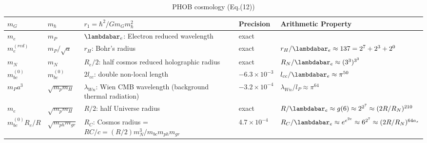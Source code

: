 \documentclass[a4paper,9pt]{article}
\newcounter{col}
\begin{document}
 

 
\begin{table}
\caption[Table \ref{tab:5:table5}: PHOB Cosmology.]{PHOB cosmology (Eq.(12))}
\label{tab:5:table5}
  \hskip-2.0cm\begin{tabular}{lllll}
    \toprule
    \cmidrule(r){1-4}
    $m_G$ & $m_{\hbar}$    & $r_1 = \hbar^2/Gm_G m_{\hbar}^2$  & Precision &Arithmetic Property \\
    \midrule
    
    $m_e$ & $m_P $ & $\lambdabar_e$: Electron reduced wavelength   & exact & \\
    
    $m_e^{(red)}$ & $m_P/\sqrt a $ & $r_H$: Bohr's radius   & exact & $ r_H/\lambdabar_e \approx 137 = 2^7+2^3+2^0 $\\
    
    $m_N $ & $m_N$   & $R_e/2$: half cosmos reduced holographic radius  &  exact & $R_N/\lambdabar_e \approx (3^3)^{3^3}$ \\
    $m_{bc}^{(0)} $ & $m_{bc}^{(0)}$   & $2l_{cc}$: double non-local length & $-6.3 \times 10^{-3}$ & $ l_{cc}/\lambdabar_e \approx \pi^{50}$  \\
    $m_Pa^3 $ & $\sqrt {m_pm_H}$  &$\lambda_{Wn}$: Wien CMB wavelength (background thermal radiation) & $-3.2 \times 10^{-4}$ &$\lambda_{Wn}/l_P \approx \pi^{64}$\\
    $m_e $ & $\sqrt {m_pm_H}$   & $R/2$: half Universe radius &exact& $R/\lambdabar_e \approx g(6) \approx 2^{2^7}\approx (2R/R_N)^{210}$   \\
    
    $m_{bc}^{(0)}R_e/R $ & $\sqrt{ m_{ph}m_{gr}}$   & $R_C$: Cosmos radius = $RC/c = (R/2)m_N^3/m_{bc}m_{ph}m_{gr}$ & $4.7 \times 10^{-4} $& $ R_C/\lambdabar_e \approx e^{e^{2e}} \approx 6^{2^7}\approx (2R/R_N)^{64a_s}  $\\
    
  
         
   \bottomrule
  \end{tabular}
\end{table}
\end{document}
